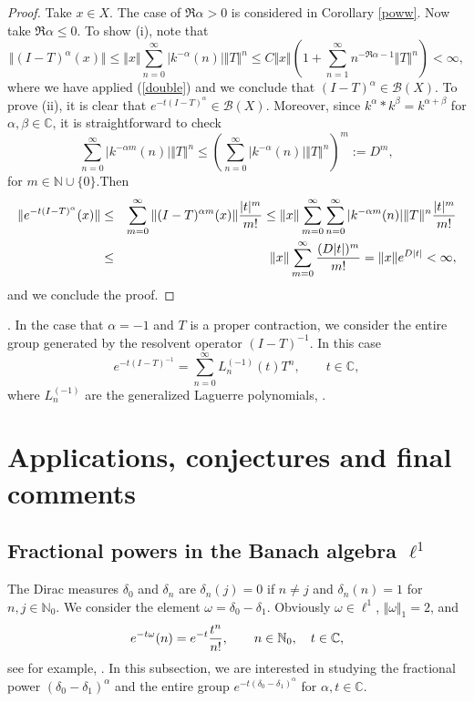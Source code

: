 \documentclass[a4paper,12pt]{amsart}
\def\NN{\mathbb N}
\def\CC{\mathbb C}
\def\CC{\mathbb C}
\theoremstyle{definition}
\theoremstyle{remark}
\begin{document}
\begin{proof} Take $x\in X$. The case of $\Re \alpha>0$ is considered in Corollary \ref{poww}. Now  take  $\Re \alpha\le 0$. To show (i), note that
$$
\Vert (I-T)^{\alpha}(x)\Vert\le \Vert x\Vert\sum_{n=0}^{\infty}\vert k^{-\alpha}(n)\vert \Vert T\Vert^n \le C\Vert x\Vert\left(1+\sum_{n=1}^{\infty}{n^{-\Re\alpha-1} }\Vert T\Vert^n\right)<\infty,
$$
where we have applied (\ref{double}) and we conclude that $(I-T)^{\alpha}\in {\mathcal B}(X)$. To prove (ii), it is clear that  $e^{-t(I-T)^\alpha}\in {\mathcal B}(X)$. Moreover,  since $k^\alpha \ast k^\beta= k^{\alpha +\beta}$ for $\alpha,\beta \in \CC$, it is straightforward to check
$$
\sum_{n=0}^\infty \vert k^{-\alpha m}(n)\vert \Vert T\Vert^n\le \left(\sum_{n=0}^\infty \vert k^{-\alpha }(n)\vert \Vert T\Vert^n\right)^m:= D^m,
$$
for $m\in \NN\cup \{0\}$.Then
\begin{eqnarray*}
    \Vert e^{-t(I-T)^\alpha}(x) \Vert&\le& \sum_{m=0}^\infty\Vert(I-T)^{\alpha m}(x)\Vert {\vert t\vert ^m  \over m!}\le \Vert x\Vert \sum_{m=0}^\infty \sum_{n=0}^\infty \vert k^{-\alpha m}(n)\vert \Vert T\Vert^n  {\vert t\vert^m  \over m!}\cr
    &\le& \Vert x\Vert \sum_{m=0}^\infty   {(D\vert t\vert)^m  \over m!}=\Vert x\Vert e^{D\vert t\vert}<\infty,\cr
\end{eqnarray*}
and we conclude the proof.
\end{proof}

 . In the case that $\alpha=-1$ and $T$ is a proper contraction, we consider the entire group generated by the resolvent operator $(I-T)^{-1}$. In this case
$$
e^{-t(I-T)^{-1}}=\sum_{n=0}^\infty L_n^{(-1)}(t)T^n,\qquad t\in \CC,
$$
where $L_n^{(-1)}$ are the generalized Laguerre polynomials, \cite[Example 8.7.3]{GR}.

\section{Applications, conjectures and final comments}

\subsection{Fractional powers in the Banach algebra $\ell^1$}\label{41}






 The Dirac measures $\delta_0$ and $\delta_n$  are $\delta_n(j)=0$ if $n\not=j$ and $\delta_n(n)=1$ for $n,j\in \NN_0.$ We consider the element $\omega=\delta_0-\delta_1$. Obviously $\omega \in \ell^1$, $\Vert \omega\Vert_1=2$, and
 $$
 e^{-t\omega}(n)={e^{-t}}{t^n\over n!}, \qquad n\in \NN_0, \quad t\in \CC,
 $$
see for example, \cite[Theorem 3.3]{GLM}. In this subsection, we are interested in studying the fractional power $(\delta_0-\delta_1)^\alpha$ and the entire group $e^{-t(\delta_0-\delta_1)^\alpha}$ for $\alpha, t\in \CC.$
\end{document}
